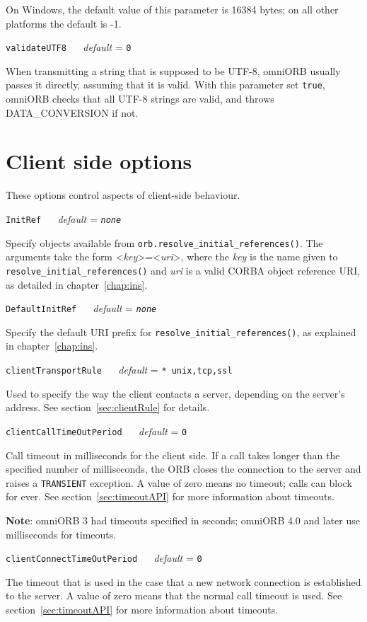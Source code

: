\documentclass[11pt,oneside,a4paper]{book}
\makeatletter
\newcommand{\code}[1]{\texttt{#1}}
\newcommand{\op}[1]{\texttt{#1()}}
\newcommand{\confopt}[2]
  {\vspace{\baselineskip}\par\noindent\code{#1} ~~ \textit{default} =
   \code{#2}}
\renewcommand{\confopt}[2]
  {\vspace{\baselineskip}\par\noindent\code{#1} ~~ \textit{default} =
   \code{#2}\\[-1ex]\@afterheading}
\newcommand{\dsc}{\discretionary{}{}{}}
\makeatother
\begin{document}
On Windows, the default value of this parameter is 16384 bytes; on all
other platforms the default is -1.


\confopt{validateUTF8}{0}

When transmitting a string that is supposed to be UTF-8, omniORB
usually passes it directly, assuming that it is valid. With this
parameter set \code{true}, omniORB checks that all UTF-8 strings are
valid, and throws DATA\_CONVERSION if not.


\section{Client side options}
\label{sec:clientconf}

These options control aspects of client-side behaviour.


\confopt{InitRef}{\textit{none}}

Specify objects available from
\op{orb.resolve\_initial\_references}. The arguments take the form
<\textit{key}>=<\textit{uri}>, where the \textit{key} is the name
given to \op{resolve\_\dsc{}initial\_\dsc{}references} and
\textit{uri} is a valid CORBA object reference URI, as detailed in
chapter~\ref{chap:ins}.


\confopt{DefaultInitRef}{\textit{none}}

Specify the default URI prefix for
\op{resolve\_\dsc{}initial\_\dsc{}references}, as explained in
chapter~\ref{chap:ins}.


\confopt{clientTransportRule}{* unix,tcp,ssl}

Used to specify the way the client contacts a server, depending on the
server's address. See section~\ref{sec:clientRule} for details.


\confopt{clientCallTimeOutPeriod}{0}

Call timeout in milliseconds for the client side. If a call takes
longer than the specified number of milliseconds, the ORB closes the
connection to the server and raises a \code{TRANSIENT} exception. A
value of zero means no timeout; calls can block for ever. See
section~\ref{sec:timeoutAPI} for more information about timeouts.

\vspace{.5\baselineskip}

\noindent\textbf{Note}: omniORB 3 had timeouts specified in seconds;
omniORB 4.0 and later use milliseconds for timeouts.


\confopt{clientConnectTimeOutPeriod}{0}

The timeout that is used in the case that a new network connection is
established to the server. A value of zero means that the normal call
timeout is used. See section~\ref{sec:timeoutAPI} for more information
about timeouts.
\end{document}
